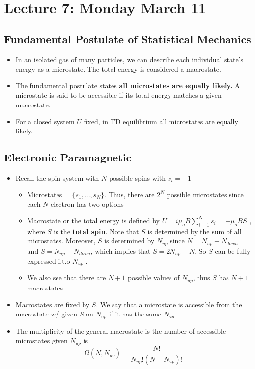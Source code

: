 \documentclass[8pt]{article}
\begin{document}
\section{Lecture 7: Monday March 11}
\subsection{Fundamental Postulate of Statistical Mechanics}
\begin{itemize}
    \item In an isolated gas of many particles, we can describe each individual state's energy as a microstate. The total energy is considered a macrostate. 
    \item The fundamental postulate states \textbf{all microstates are equally likely.} A microstate is said to be accessible if its total energy matches a given macrostate. 
\end{itemize}

\begin{itemize}
    \item For a closed system $U$ fixed, in TD equilibrium all microstates are equally likely. 
\end{itemize}

\subsection{Electronic Paramagnetic}
\begin{itemize}
    \item Recall the spin system with $N$ possible spins with $s_i = \pm 1$ 
    \begin{itemize}
        \item Microstates = $\{s_1, ..., s_N\}$. Thus, there are $2^N$ possible microstates since each $N$ electron has two options  
        \item Macrostate or the total energy is defined by $U = i\mu_o B \sum_{i=1}^{N} s_i = -\mu_o BS$ , where $S$ is the \textbf{total spin}. Note that $S$ is determined by the sum of all microstates. Moreover, $S$ is determined by $N_{up}$ since $N = N_{up} +N_{down}$ and $S = N_{up} - N_{down}$, which implies that $S = 2N_{up} - N$. So $S$ can be fully expressed i.t.o $N_{up}$ . 
        \item We also see that there are $N+1$ possible values of $N_{up}$, thus $S$ has $N+1$ macrostates.
    \end{itemize}
    \item Macrostates are fixed by $S$. We say that a microstate is accessible from the macrostate w/ given $S$ on $N_{up}$ if it has the same $N_{up}$ 
    \item The multiplicity of the general macrostate is the number of accessible microstates given $N_{up}$ is \[\Omega(N, N_{up}) = \frac{N!}{N_{up}! (N-N_{up})!}\]
\end{itemize}
\end{document}
